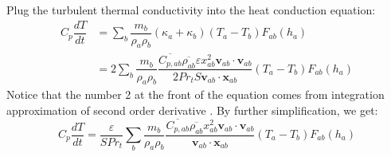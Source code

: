 \documentclass[journal abbreviation, manuscript]{copernicus}
\begin{document}
Plug the turbulent thermal conductivity into the heat conduction equation:
\begin{equation}
\begin{split}
C_p \dfrac{dT}{dt} 
& = \sum_b \dfrac{m_b}{\rho_a \rho_b} (\kappa_a + \kappa_b) (T_a - T_b) F_{ab} (h_a) \\
 &= 2 \sum_b \dfrac{m_b}{\rho_a \rho_b} \dfrac{\overline{C_{p,ab}} \overline{\rho_{ab}} \varepsilon x_{ab}^2 \textbf{v}_{ab} \cdot \textbf{v}_{ab}}{2 Pr_t  S \textbf{v}_{ab} \cdot \textbf{x}_{ab} } (T_a - T_b) F_{ab} (h_a)
\end{split}
\end{equation}
Notice that the number 2 at the front of the equation comes from integration approximation of second order derivative \citep {cleary1999conduction}. By further simplification, we get:
\begin{equation}
C_p \dfrac{dT}{dt}
 =\dfrac{\varepsilon}{S  Pr_t}  \sum_b \dfrac{m_b}{\rho_a \rho_b} \dfrac{\overline{C_{p,ab}} \overline{\rho_{ab}} x_{ab}^2 \textbf{v}_{ab} \cdot \textbf{v}_{ab}}{\textbf{v}_{ab} \cdot \textbf{x}_{ab}} (T_a - T_b) F_{ab} (h_a)
\end{equation}
\end{document}
